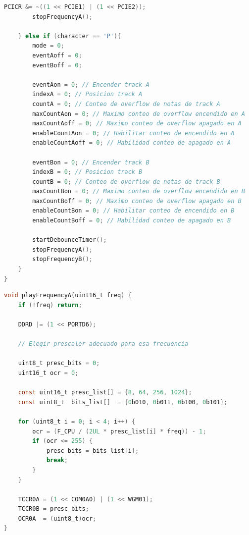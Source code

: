 \begin{lstlisting}[language=C, caption={Manejo de eventos RX USART}]
		PCICR &= ~((1 << PCIE1) | (1 << PCIE2));
		stopFrequencyA();

	} else if (character == 'P'){
		mode = 0;
		eventAoff = 0;
		eventBoff = 0;
				
		eventAon = 0; // Encender track A
		indexA = 0; // Posicion track A
		countA = 0; // Conteo de overflow de notas de track A
		maxCountAon = 0; // Maximo conteo de overflow encendido en A
		maxCountAoff = 0; // Maximo conteo de overflow apagado en A
		enableCountAon = 0; // Habilitar conteo de encendido en A
		enableCountAoff = 0; // Habilidad conteo de apagado en A
				
		eventBon = 0; // Encender track B
		indexB = 0; // Posicion track B
		countB = 0; // Conteo de overflow de notas de track B
		maxCountBon = 0; // Maximo conteo de overflow encendido en B
		maxCountBoff = 0; // Maximo conteo de overflow apagado en B
		enableCountBon = 0; // Habilitar conteo de encendido en B
		enableCountBoff = 0; // Habilidad conteo de apagado en B
		
		startDebounceTimer();
		stopFrequencyA();
		stopFrequencyB();
	}
}
\end{lstlisting}


\begin{lstlisting}[language=C, caption={Reproduccion de frecuencias}]
void playFrequencyA(uint16_t freq) {
	if (!freq) return;  

	DDRD |= (1 << PORTD6);
	
	// Elegir prescaler adecuado para esa frecuencia

	uint8_t presc_bits = 0;     
	uint16_t ocr = 0;

	const uint16_t presc_list[] = {8, 64, 256, 1024};
	const uint8_t  bits_list[]  = {0b010, 0b011, 0b100, 0b101};

	for (uint8_t i = 0; i < 4; i++) {
		ocr = (F_CPU / (2UL * presc_list[i] * freq)) - 1;
		if (ocr <= 255) {
			presc_bits = bits_list[i];
			break;
		}
	}

	TCCR0A = (1 << COM0A0) | (1 << WGM01);
	TCCR0B = presc_bits;          
	OCR0A  = (uint8_t)ocr;        
}
\end{lstlisting}





